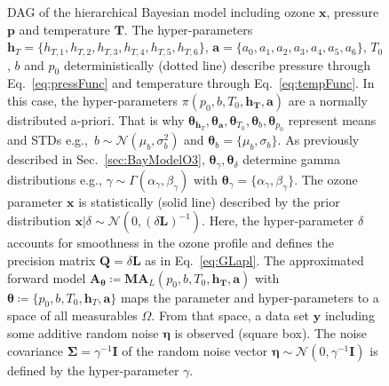 \begin{figure}[thb!]
	\caption[Directed acyclic graph of Bayesian model for ozone $\bm{x}$, pressure $\bm{p}$ and temperature $\bm{T}$.]{DAG of the hierarchical Bayesian model including ozone $\bm{x}$, pressure $\bm{p}$ and temperature $\bm{T}$. The hyper-parameters $\bm{h}_T= \{ h_{T,1}, h_{T,2},h_{T,3},h_{T,4},h_{T,5},h_{T,6}\}$, $\bm{a} = \{ a_0, a_1, a_2,a_3,a_4,a_5,a_6\}$, $T_0$, $b$ and $p_0$ deterministically (dotted line) describe pressure through Eq.~\ref{eq:pressFunc} and temperature through Eq.~\ref{eq:tempFunc}. In this case, the hyper-parameters $\pi(p_0,b,T_0,\bm{h_T},\bm{a})$ are a normally distributed a-priori. That is why $\bm{\theta}_{\bm{h}_T},\bm{\theta}_{\bm{a}}, \bm{\theta}_{T_{0}},\bm{\theta}_{b} , \bm{\theta}_{p_0}$ represent means and STDs e.g.,~$b \sim \mathcal{N}(\mu_b, \sigma^2_b)$ and $\bm{\theta}_{b} = \{\mu_b, \sigma_b\}$.
	As previously described in Sec.~\ref{sec:BayModelO3}, $\bm{\theta}_{\gamma}, \bm{\theta}_{\delta}$ determine gamma distributions e.g., $\gamma \sim \Gamma(\alpha_{\gamma},\beta_{\gamma}) $ with $\bm{\theta}_{\gamma} = 	\{\alpha_{\gamma},\beta_{\gamma} \}$.
	The ozone parameter $\bm{x}$ is statistically (solid line) described by the prior distribution $\bm{x}| \delta \sim \mathcal{N}(0,(\delta \bm{L})^{-1}) $. 
	Here, the hyper-parameter $\delta$ accounts for smoothness in the ozone profile and defines the precision matrix $\bm{Q} = \delta \bm{L}$ as in Eq.~\ref{eq:GLapl}.
	The approximated forward model $\bm{A}_{\bm{\theta}} \coloneqq \bm{M}\bm{A}_L(p_0,b,T_0,\bm{h_T},\bm{a})$ with $\bm{\theta}  \coloneqq \{p_0, b, T_0,\bm{h}_T,\bm{a} \}$ maps the parameter and hyper-parameters to a space of all measurables $\Omega$. 
	From that space, a data set $\bm{y}$ including some additive random noise $\bm{\eta}$ is observed (square box).
	The noise covariance $\bm{\Sigma} = \gamma^{-1} \bm{I}$ of the random noise vector $\bm{\eta} \sim \mathcal{N}(0,\gamma^{-1} \bm{I} ) $ is defined by the hyper-parameter $\gamma$.}
	\label{fig:DAGComplete}
\end{figure}

